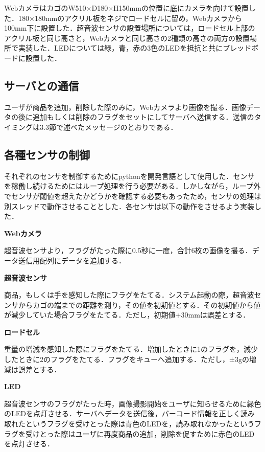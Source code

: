 WebカメラはカゴのW510×D180×H150mmの位置に底にカメラを向けて設置した．180×180mmのアクリル板をネジでロードセルに留め，Webカメラから100mm下に設置した．超音波センサの設置場所については，ロードセル上部のアクリル板と同じ高さと，Webカメラと同じ高さの2種類の高さの両方の設置場所で実装した．LEDについては緑，青，赤の3色のLEDを抵抗と共にブレッドボードに設置した．

\subsection*{サーバとの通信}

ユーザが商品を追加，削除した際のみに，Webカメラより画像を撮る．画像データの後に追加もしくは削除のフラグをセットにしてサーバへ送信する．送信のタイミングは3.3節で述べたメッセージのとおりである．

\subsection*{各種センサの制御}

それぞれのセンサを制御するためにpythonを開発言語として使用した．センサを稼働し続けるためにはループ処理を行う必要がある．しかしながら，ループ外でセンサが閾値を超えたかどうかを確認する必要もあったため，センサの処理は別スレッドで動作させることとした．各センサは以下の動作をさせるよう実装した．


\noindent
{\bf Webカメラ}

超音波センサより，フラグがたった際に0.5秒に一度，合計6枚の画像を撮る．データ送信用配列にデータを追加する．

\noindent
{\bf 超音波センサ}

商品，もしくは手を感知した際にフラグをたてる．システム起動の際，超音波センサからカゴの端までの距離を測り，その値を初期値とする．その初期値から値が減少していた場合フラグをたてる．ただし，初期値+30mmは誤差とする．

\noindent
{\bf ロードセル}

重量の増減を感知した際にフラグをたてる．増加したときに1のフラグを，減少したときに2のフラグをたてる．フラグをキューへ追加する．ただし，±3gの増減は誤差とする．

\noindent
{\bf LED}

超音波センサのフラグがたった時，画像撮影開始をユーザに知らせるために緑色のLEDを点灯させる．サーバへデータを送信後，バーコード情報を正しく読み取れたというフラグを受けとった際は青色のLEDを，読み取れなかったというフラグを受けとった際はユーザに再度商品の追加，削除を促すために赤色のLEDを点灯させる．




